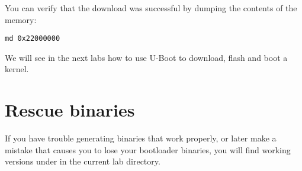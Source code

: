 You can verify that the download was successful by dumping the
contents of the memory:

\begin{verbatim}
md 0x22000000
\end{verbatim}

We will see in the next labs how to use U-Boot to download, flash and
boot a kernel.

\section{Rescue binaries}

If you have trouble generating binaries that work properly, or later
make a mistake that causes you to lose your bootloader binaries, you
will find working versions under  in the current lab
directory.
